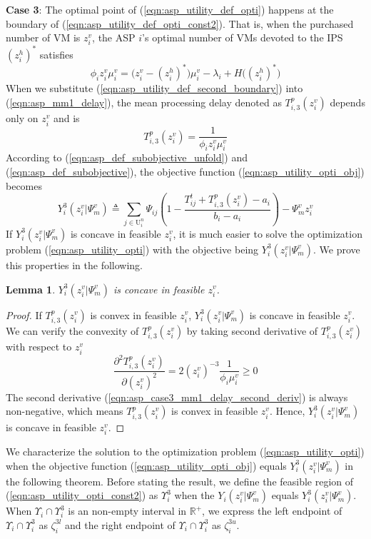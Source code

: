 \documentclass[conference]{IEEEtran}
\newtheorem{lemma}{Lemma}
\begin{document}
\textbf{Case 3}: The optimal point of (\ref{eqn:asp_utility_def_opti}) happens at the boundary of (\ref{eqn:asp_utility_def_opti_const2}). That is, when the purchased number of VM is $z_i^v$, the ASP $i$'s optimal number of VMs devoted to the IPS $(z_i^h)^*$ satisfies
\begin{equation} \label{eqn:asp_utility_def_second_boundary}
\phi_i z_i^v \mu_i^v = \big(z_i^v-(z_i^h)^*\big)\mu_i^v - \lambda_i + H\big((z_i^h)^*\big)
\end{equation}
When we substitute (\ref{eqn:asp_utility_def_second_boundary}) into (\ref{eqn:asp_mm1_delay}), the mean processing delay denoted as $T_{i,3}^p(z_i^v)$ depends only on $z_i^v$ and is
\begin{equation}
T_{i,3}^p(z_i^v) = \frac{1}{\phi_i z_i^v \mu_i^v}
\end{equation}
According to (\ref{eqn:asp_def_subobjective_unfold}) and (\ref{eqn:asp_def_subobjective}), the objective function (\ref{eqn:asp_utility_opti_obj}) becomes
\begin{equation}
Y_i^3(z_i^v|\Psi_m^v) \triangleq \sum_{j \in \mathrm{U}_i^n}\Psi_{ij}(1-\frac{T_{ij}^t + T_{i,3}^p(z_i^v)-a_i}{b_i-a_i}) - \Psi_m^vz_i^v
\end{equation}
If $Y_i^3(z_i^v|\Psi_m^v)$ is concave in feasible $z_i^v$, it is much easier to solve the optimization problem (\ref{eqn:asp_utility_opti}) with the objective being $Y_i^3(z_i^v|\Psi_m^v)$. We prove this properties in the following.
\begin{lemma} \label{lemma:asp_case3_utility_concave}
$Y_i^3(z_i^v|\Psi_m^v)$ is concave in feasible $z_i^v$.
\end{lemma}
\begin{proof}
If $T_{i,3}^p(z_i^v)$ is convex in feasible $z_i^v$, $Y_i^3(z_i^v|\Psi_m^v)$ is concave in feasible $z_i^v$. We can verify the convexity of $T_{i,3}^p(z_i^v)$ by taking second derivative of $T_{i,3}^p(z_i^v)$ with respect to $z_i^v$
\begin{equation} \label{eqn:asp_case3_mm1_delay_second_deriv}
\frac{\partial^2 T_{i,3}^p(z_i^v)}{\partial (z_i^v)^2} = 2(z_i^v)^{-3}\frac{1}{\phi_i \mu_i^v} \geq 0
\end{equation}
The second derivative (\ref{eqn:asp_case3_mm1_delay_second_deriv}) is always non-negative, which means $T_{i,3}^p(z_i^v)$ is convex in feasible $z_i^v$. Hence, $Y_i^3(z_i^v|\Psi_m^v)$ is concave in feasible $z_i^v$.
\end{proof}
We characterize the solution to the optimization problem (\ref{eqn:asp_utility_opti}) when the objective function (\ref{eqn:asp_utility_opti_obj}) equals $Y_i^3(z_i^v|\Psi_m^v)$ in the following theorem. Before stating the result, we define the feasible region of (\ref{eqn:asp_utility_opti_const2}) as $\Upsilon_i^3$ when the $Y_i(z_i^v|\Psi_m^v)$ equals $Y_i^3(z_i^v|\Psi_m^v)$. When $\Upsilon_i \cap \Upsilon_i^3$ is an non-empty interval in $\mathbb{R}^+$, we express the left endpoint of $\Upsilon_i \cap \Upsilon_i^3$ as $\zeta_i^{3l}$ and the right endpoint of $\Upsilon_i \cap \Upsilon_i^3$ as $\zeta_i^{3u}$.
\end{document}
